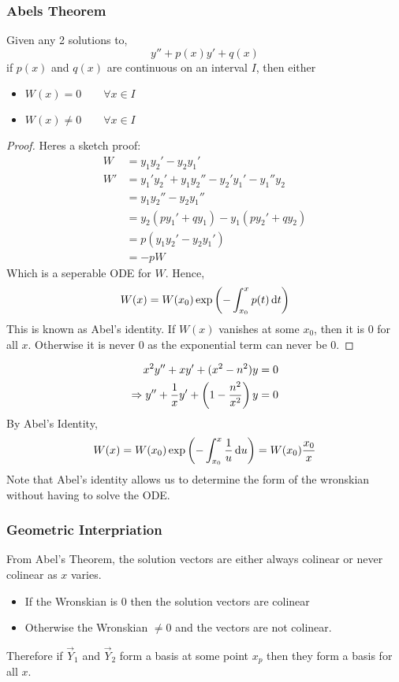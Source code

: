 \documentclass{article}
\begin{document}
\subsubsection{Abels Theorem}
\begin{thm}
    Given any 2 solutions to,
    \[
        y'' + p(x) y' + q(x)
    \]
    if $p(x)$ and $q(x)$ are continuous on an interval $I$, then either
    \begin{itemize}
        \item $W(x) = 0 \qquad \forall x \in I$
        \item $W(x) \neq 0 \qquad \forall x \in I $
    \end{itemize}
\end{thm}
\begin{proof}
    Heres a sketch proof:
    \begin{align*}
        W &= y_1 y_2' - y_2y_1' \\
        W' &= y_1' y_2' + y_1 y_2''- y_2' y_1' - y_1'' y_2 \\
        &= y_1 y_2'' - y_2 y_1'' \\
        &= y_2 (py_1' + q y_1) - y_1 (p y_2' + q y_2) \\
        &= p (y_1 y_2' - y_2y_1') \\
        &= - pW
    \end{align*}
    Which is a seperable ODE for $W$. Hence,
    \[
        W(x) = W(x_0) \exp \left( - \int_{x_0}^{x}{p(t) \mathop{}\!\mathrm{d} t} \right)  
    \]
    This is known as Abel's identity.
    If $W(x)$ vanishes at some $x_0$, then it is $0$ for all $x$. 
    Otherwise it is never $0$ as the exponential term can never be $0$.
\end{proof}

\begin{eg}
    \begin{align*}
        x^2 y'' + xy' + (x^2 - n^2)y = 0 \\
        \Rightarrow y'' + \frac{1}{x} y' + \left( 1 - \frac{n^2}{x^2} \right)y = 0
    \end{align*}
    By Abel's Identity,
    \[
        W(x) = W(x_0) \exp \left( - \int_{x_0}^{x}{\frac{1}{u} \mathop{}\!\mathrm{d} u} \right) = W(x_0) \frac{x_0}{x}
    \]
    Note that Abel's identity allows us to determine the form of the wronskian without having to solve the ODE.
\end{eg}

\subsubsection*{Geometric Interpriation}
From Abel's Theorem, the solution vectors are either always colinear or never colinear as $x$ varies.
\begin{itemize}
    \item If the Wronskian is $0$ then the solution vectors are colinear
    \item Otherwise the Wronskian $\neq 0$ and the vectors are not colinear.
\end{itemize}
Therefore if $\vec Y_1$ and $\vec Y_2$ form a basis at some point $x_p$ then they form a basis for all $x$.
\end{document}
